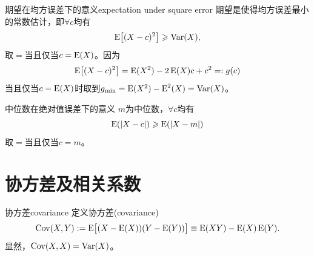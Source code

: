 
\begin{example}{期望在均方误差下的意义}{expectation under square error}
	期望是使得均方误差最小的常数估计，即$\forall c$均有
	\begin{equation}\label{eq:ps-mean-least-squares}
		\operatorname{E}\bigl[(X - c)^2\bigr] \geqslant \operatorname{Var}(X),
	\end{equation}
	取$=$当且仅当$c = \operatorname{E}(X)$。因为
	\begin{equation*}
		\operatorname{E}\bigl[(X - c)^2\bigr] = \operatorname{E}(X^2) - 2\operatorname{E}(X)c + c^2 =: g(c)
	\end{equation*}
	当且仅当$c = \operatorname{E}(X)$时取到$g_{\min} = \operatorname{E}(X^2) - \operatorname{E}^2(X) = \operatorname{Var}(X)$。
\end{example}
\begin{example}{中位数在绝对值误差下的意义}{}
	$m$为中位数，$\forall c$均有
	\begin{equation}\label{eq:ps-median-absolute-deviation}
		\operatorname{E}(\lvert X - c\rvert) \geqslant \operatorname{E}(\lvert X - m\rvert)
	\end{equation}
	取$=$当且仅当$c = m$。
\end{example}
\section{协方差及相关系数}
\begin{definition}{协方差}{covariance}
	定义协方差(covariance)
	\begin{equation}
		\operatorname{Cov}(X,Y) := \operatorname{E}\bigl[(X - \operatorname{E}(X))(Y - \operatorname{E}(Y))\bigr] \equiv \operatorname{E}(XY) - \operatorname{E}(X)\operatorname{E}(Y).
	\end{equation}
	显然，$\operatorname{Cov}(X,X) = \operatorname{Var}(X)$。
\end{definition}

